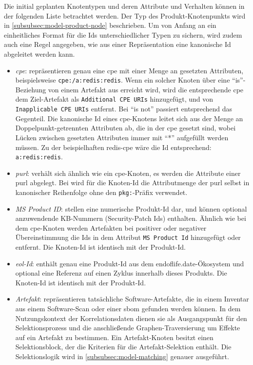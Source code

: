 Die initial geplanten Knotentypen und deren Attribute und Verhalten können in der folgenden Liste betrachtet werden.
Der Typ des Produkt-Knotenpunkts wird in \autoref{subsubsec:model-product-node} beschrieben.
Um von Anfang an ein einheitliches Format für die Ids unterschiedlicher Typen zu sichern, wird zudem auch eine Regel angegeben, wie aus einer Repräsentation eine kanonische Id abgeleitet werden kann.

\begin{itemize}
    \itemsep0em
    \item \textit{\acrshort{cpe}}: repräsentieren genau eine \acrshort{cpe} mit einer Menge an gesetzten Attributen, beispielsweise \texttt{cpe:/a:redis:redis}.
    Wenn ein solcher Knoten über eine \enquote{is}-Beziehung von einem Artefakt aus erreicht wird, wird die entsprechende \acrshort{cpe} dem Ziel-Artefakt als \texttt{Additional CPE URIs} hinzugefügt, und von \texttt{Inapplicable CPE URIs} entfernt.
    Bei \enquote{is not} passiert entsprechend das Gegenteil.
    Die kanonische Id eines \acrshort{cpe}-Knotens leitet sich aus der Menge an Doppelpunkt-getrennten Attributen ab, die in der \acrshort{cpe} gesetzt sind, wobei Lücken zwischen gesetzten Attributen immer mit \enquote{*} aufgefüllt werden müssen.
    Zu der beispielhaften redis-\acrshort{cpe} wäre die Id entsprechend: \texttt{a:redis:redis}.
    \item \textit{\acrshort{purl}}: verhält sich ähnlich wie ein \acrshort{cpe}-Knoten, es werden die Attribute einer \acrshort{purl} abgelegt.
    Bei  wird für die Knoten-Id die Attributmenge der \acrshort{purl} selbst in kanonischer Reihenfolge ohne den \texttt{pkg:}-Präfix verwendet.
    \item \textit{MS Product ID}: stellen eine numerische Produkt-Id dar, und können optional anzuwendende KB-Nummern (Security-Patch Ids) enthalten.
    Ähnlich wie bei dem \acrshort{cpe}-Knoten werden Artefakten bei positiver oder negativer Übereinstimmung die Ids in dem Attribut \texttt{MS Product Id} hinzugefügt oder entfernt.
    Die Knoten-Id ist identisch mit der Produkt-Id.
    \item \textit{\acrshort{eol}-Id}: enthält genau eine Produkt-Id aus dem endoflife.date-Ökosystem und optional eine Referenz auf einen Zyklus innerhalb dieses Produkts.
    Die Knoten-Id ist identisch mit der Produkt-Id.
    \item \textit{Artefakt}: repräsentieren tatsächliche Software-Artefakte, die in einem Inventar aus einem Software-Scan oder einer \acrshort{sbom} gefunden werden können.
    In dem Nutzungskontext der Korrelationsdaten dienen sie als Ausgangspunkt für den Selektionsprozess und die anschließende Graphen-Traversierung um Effekte auf ein Artefakt zu bestimmen.
    Ein Artefakt-Knoten besitzt einen Selektionsblock, der die Kriterien für die Artefakt-Selektion enthält.
    Die Selektionslogik wird in \autoref{subsubsec:model-matching} genauer ausgeführt.
\end{itemize}

